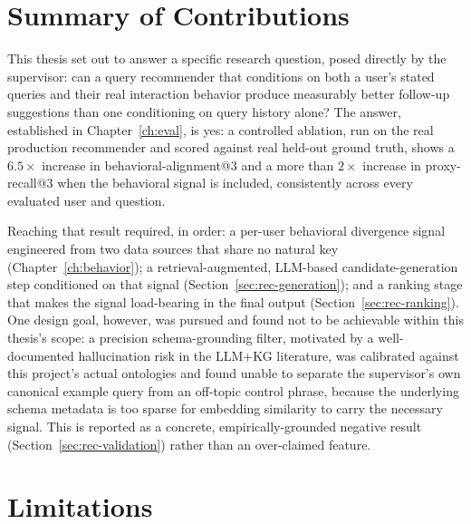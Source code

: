 \section{Summary of Contributions}
\label{sec:conclusion-summary}

This thesis set out to answer a specific research question, posed directly by the supervisor: can a
query recommender that conditions on both a user's stated queries and their real interaction
behavior produce measurably better follow-up suggestions than one conditioning on query history
alone? The answer, established in Chapter~\ref{ch:eval}, is yes: a controlled ablation, run on the
real production recommender and scored against real held-out ground truth, shows a $6.5\times$
increase in behavioral-alignment@3 and a more than $2\times$ increase in proxy-recall@3 when the
behavioral signal is included, consistently across every evaluated user and question.

Reaching that result required, in order: a per-user behavioral divergence signal engineered from two
data sources that share no natural key (Chapter~\ref{ch:behavior}); a retrieval-augmented,
LLM-based candidate-generation step conditioned on that signal (Section~\ref{sec:rec-generation});
and a ranking stage that makes the signal load-bearing in the final output
(Section~\ref{sec:rec-ranking}). One design goal, however, was pursued and found not to be
achievable within this thesis's scope: a precision schema-grounding filter, motivated by a
well-documented hallucination risk in the LLM+KG literature, was calibrated against this project's
actual ontologies and found unable to separate the supervisor's own canonical example query from an
off-topic control phrase, because the underlying schema metadata is too sparse for embedding
similarity to carry the necessary signal. This is reported as a concrete, empirically-grounded
negative result (Section~\ref{sec:rec-validation}) rather than an over-claimed feature.

\section{Limitations}
\label{sec:conclusion-limits}

